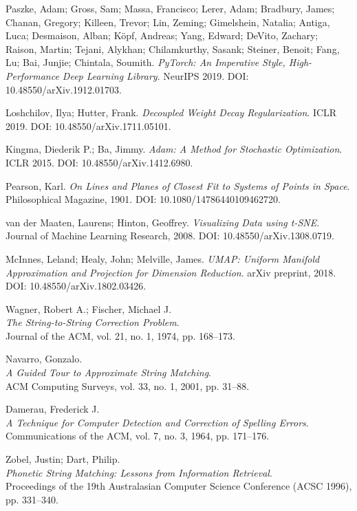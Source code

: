 \documentclass[12pt]{article}
\begin{document}
\begin{thebibliography}{9}
Paszke, Adam; Gross, Sam; Massa, Francisco; Lerer, Adam; Bradbury, James; Chanan, Gregory; Killeen, Trevor; Lin, Zeming; Gimelshein, Natalia; Antiga, Luca; Desmaison, Alban; Köpf, Andreas; Yang, Edward; DeVito, Zachary; Raison, Martin; Tejani, Alykhan; Chilamkurthy, Sasank; Steiner, Benoit; Fang, Lu; Bai, Junjie; Chintala, Soumith.
\textit{PyTorch: An Imperative Style, High-Performance Deep Learning Library}.
NeurIPS 2019.
DOI: 10.48550/arXiv.1912.01703.

Loshchilov, Ilya; Hutter, Frank.
\textit{Decoupled Weight Decay Regularization}.
ICLR 2019.
DOI: 10.48550/arXiv.1711.05101.

Kingma, Diederik P.; Ba, Jimmy.
\textit{Adam: A Method for Stochastic Optimization}.
ICLR 2015.
DOI: 10.48550/arXiv.1412.6980.

Pearson, Karl.
\textit{On Lines and Planes of Closest Fit to Systems of Points in Space}.
Philosophical Magazine, 1901.
DOI: 10.1080/14786440109462720.

van der Maaten, Laurens; Hinton, Geoffrey.
\textit{Visualizing Data using t-SNE}.
Journal of Machine Learning Research, 2008.
DOI: 10.48550/arXiv.1308.0719.

McInnes, Leland; Healy, John; Melville, James.
\textit{UMAP: Uniform Manifold Approximation and Projection for Dimension Reduction}.
arXiv preprint, 2018.
DOI: 10.48550/arXiv.1802.03426.

Wagner, Robert A.; Fischer, Michael J.\\
\textit{The String-to-String Correction Problem}.\\
Journal of the ACM, vol. 21, no. 1, 1974, pp. 168--173.

Navarro, Gonzalo.\\
\textit{A Guided Tour to Approximate String Matching}.\\
ACM Computing Surveys, vol. 33, no. 1, 2001, pp. 31--88.

Damerau, Frederick J.\\
\textit{A Technique for Computer Detection and Correction of Spelling Errors}.\\
Communications of the ACM, vol. 7, no. 3, 1964, pp. 171--176.

Zobel, Justin; Dart, Philip.\\
\textit{Phonetic String Matching: Lessons from Information Retrieval}.\\
Proceedings of the 19th Australasian Computer Science Conference (ACSC 1996), pp. 331--340.

\end{thebibliography}
\end{document}
